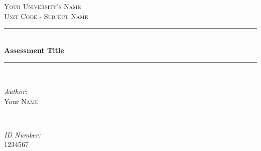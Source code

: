 
\begin{titlepage}

\newcommand{\HRule}{\rule{\linewidth}{0.5mm}} %

\centering %
 

\textsc{\LARGE Your University's Name}\\[1cm] %
\textsc{\Large Unit Code - Subject Name}\\[0.5cm] %


\HRule \\[0.4cm]
{ \huge \bfseries Assessment Title}\\[0.2cm] %
\HRule \\[.5cm]
 

\begin{minipage}{0.45\textwidth}
\begin{flushleft} \large
\emph{Author:}\\
Your \textsc{Name}\\
\end{flushleft}
\end{minipage}
~
\begin{minipage}{0.45\textwidth}
\begin{flushright} \large
\emph{ID Number:}\\
1234567\\
\end{flushright}
\end{minipage}\\[1.5cm]


\end{titlepage}
